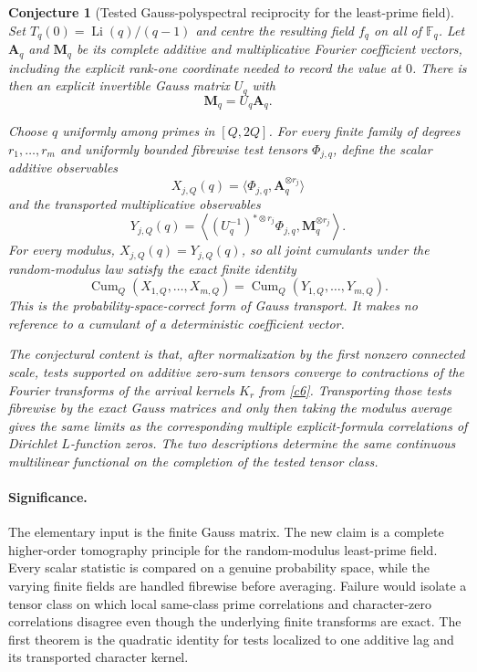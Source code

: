 \documentclass[11pt]{article}
\newtheorem{conjecture}{Conjecture}
\newcommand{\Li}{\operatorname{Li}}
\newcommand{\Fq}{\mathbb F}
\begin{document}
\begin{conjecture}[Tested Gauss-polyspectral reciprocity for the least-prime field]\label{c7}
Set $T_q(0)=\Li(q)/(q-1)$ and centre the resulting field $f_q$ on all of $\Fq_q$.
Let $\mathbf A_q$ and $\mathbf M_q$ be its complete additive and multiplicative Fourier
coefficient vectors, including the explicit rank-one coordinate needed to record the
value at $0$.  There is then an explicit invertible Gauss matrix $U_q$ with
\[
 \mathbf M_q=U_q\mathbf A_q.
\]

Choose $q$ uniformly among primes in $[Q,2Q]$.  For every finite family of degrees
$r_1,\ldots,r_m$ and uniformly bounded fibrewise test tensors
$\Phi_{j,q}$, define the scalar additive observables
\[
 X_{j,Q}(q)=\langle\Phi_{j,q},\mathbf A_q^{\otimes r_j}\rangle
\]
and the transported multiplicative observables
\[
 Y_{j,Q}(q)=
 \left\langle (U_q^{-1})^{*\otimes r_j}\Phi_{j,q},
               \mathbf M_q^{\otimes r_j}\right\rangle.
\]
For every modulus, $X_{j,Q}(q)=Y_{j,Q}(q)$, so all joint cumulants under the
random-modulus law satisfy the exact finite identity
\[
 \operatorname{Cum}_Q(X_{1,Q},\ldots,X_{m,Q})
 =\operatorname{Cum}_Q(Y_{1,Q},\ldots,Y_{m,Q}).
\]
This is the probability-space-correct form of Gauss transport.  It makes no reference to
a cumulant of a deterministic coefficient vector.

The conjectural content is that, after normalization by the first nonzero connected
scale, tests supported on additive zero-sum tensors converge to contractions of the
Fourier transforms of the arrival kernels $K_r$ from \cref{c6}.  Transporting those
tests fibrewise by the exact Gauss matrices and only then taking the modulus average
gives the same limits as the corresponding multiple explicit-formula correlations of
Dirichlet $L$-function zeros.  The two descriptions determine the same continuous
multilinear functional on the completion of the tested tensor class.
\end{conjecture}

\paragraph{Significance.}
The elementary input is the finite Gauss matrix.  The new claim is a complete
higher-order tomography principle for the random-modulus least-prime field.  Every
scalar statistic is compared on a genuine probability space, while the varying finite
fields are handled fibrewise before averaging.  Failure would isolate a tensor class on
which local same-class prime correlations and character-zero correlations disagree even
though the underlying finite transforms are exact.  The first theorem is the quadratic
identity for tests localized to one additive lag and its transported character kernel.
\end{document}

